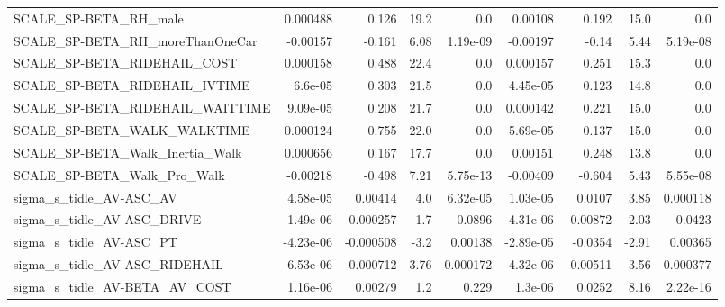 \begin{tabular}{lrrrrrrrr}
SCALE\_SP-BETA\_RH\_male                              &    0.000488 &        0.126 &     19.2 &      0.0 &    0.00108 &       0.192 &         15.0 &           0.0 \\
SCALE\_SP-BETA\_RH\_moreThanOneCar                    &    -0.00157 &       -0.161 &     6.08 & 1.19e-09 &   -0.00197 &       -0.14 &         5.44 &      5.19e-08 \\
SCALE\_SP-BETA\_RIDEHAIL\_COST                        &    0.000158 &        0.488 &     22.4 &      0.0 &   0.000157 &       0.251 &         15.3 &           0.0 \\
SCALE\_SP-BETA\_RIDEHAIL\_IVTIME                      &     6.6e-05 &        0.303 &     21.5 &      0.0 &   4.45e-05 &       0.123 &         14.8 &           0.0 \\
SCALE\_SP-BETA\_RIDEHAIL\_WAITTIME                    &    9.09e-05 &        0.208 &     21.7 &      0.0 &   0.000142 &       0.221 &         15.0 &           0.0 \\
SCALE\_SP-BETA\_WALK\_WALKTIME                        &    0.000124 &        0.755 &     22.0 &      0.0 &   5.69e-05 &       0.137 &         15.0 &           0.0 \\
SCALE\_SP-BETA\_Walk\_Inertia\_Walk                    &    0.000656 &        0.167 &     17.7 &      0.0 &    0.00151 &       0.248 &         13.8 &           0.0 \\
SCALE\_SP-BETA\_Walk\_Pro\_Walk                        &    -0.00218 &       -0.498 &     7.21 & 5.75e-13 &   -0.00409 &      -0.604 &         5.43 &      5.55e-08 \\
sigma\_s\_tidle\_AV-ASC\_AV                            &    4.58e-05 &      0.00414 &      4.0 & 6.32e-05 &   1.03e-05 &      0.0107 &         3.85 &      0.000118 \\
sigma\_s\_tidle\_AV-ASC\_DRIVE                         &    1.49e-06 &     0.000257 &     -1.7 &   0.0896 &  -4.31e-06 &    -0.00872 &        -2.03 &        0.0423 \\
sigma\_s\_tidle\_AV-ASC\_PT                            &   -4.23e-06 &    -0.000508 &     -3.2 &  0.00138 &  -2.89e-05 &     -0.0354 &        -2.91 &       0.00365 \\
sigma\_s\_tidle\_AV-ASC\_RIDEHAIL                      &    6.53e-06 &     0.000712 &     3.76 & 0.000172 &   4.32e-06 &     0.00511 &         3.56 &      0.000377 \\
sigma\_s\_tidle\_AV-BETA\_AV\_COST                      &    1.16e-06 &      0.00279 &      1.2 &    0.229 &    1.3e-06 &      0.0252 &         8.16 &      2.22e-16 \\

\end{tabular}
